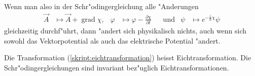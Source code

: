 Wenn man also in der Schr"odingergleichung alle "Anderungen
\begin{equation}
\begin{aligned}
\vec A&\mapsto \vec A + \operatorname{grad}\chi,
&
\varphi&\mapsto \varphi-\frac{\partial\chi}{\partial t}
&
&\text{und}&
\psi
&\mapsto
e^{-\frac{i}{\hbar}\chi}\psi
\label{skript:eichtransformation}
\end{aligned}
\end{equation}
gleichzeitig durchf"uhrt, dann "andert sich physikalisch nichts,
auch wenn sich sowohl das Vektorpotential als auch das
elektrische Potential "andert.

Die Transformation (\ref{skript:eichtransformation}) heisst Eichtransformation.
Die Schr"odingergleichungen sind invariant bez"uglich Eichtransformationen.


